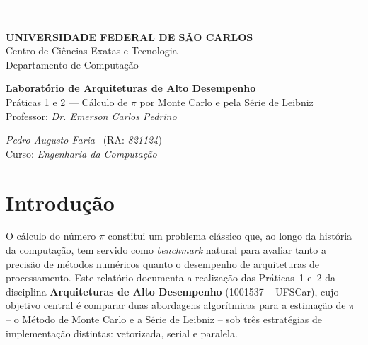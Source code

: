 \documentclass[12pt, a4paper]{article}
\begin{document}
	
	\thispagestyle{empty}
	
	\begin{titlepage}
		\centering
		
		\noindent\rule{\textwidth}{0.8pt}\\[0.2cm]
		{\large \textbf{UNIVERSIDADE FEDERAL DE SÃO CARLOS}}\\[0.15cm]
		{\normalsize Centro de Ciências Exatas e Tecnologia}\\[0.15cm]
		{\normalsize Departamento de Computação}\\[0.15cm]
		
		\vspace{0pt plus 0.35fill}
		
		{\large \textbf{Laboratório de Arquiteturas de Alto Desempenho}}\\[0.4cm]
		{\large Práticas 1 e 2 — Cálculo de $\pi$ por Monte Carlo e pela Série de Leibniz}\\[1.0cm]
		{\normalsize Professor: \textit{Dr. Emerson Carlos Pedrino}}\\
		
		\vspace{0pt plus 0.65fill}
		
		\begin{center}
			{\normalsize \textit{Pedro Augusto Faria} \ (RA: \textit{821124})}\\[0.15cm]

			{\normalsize Curso: \textit{Engenharia da Computação}}\\[0.15cm]
		\end{center}
		
	\end{titlepage}
	
	\setcounter{page}{1}
	
	\section{Introdução}
	
	O cálculo do número $\pi$ constitui um problema clássico que, ao longo da história
	da computação, tem servido como \textit{benchmark} natural para avaliar tanto a
	precisão de métodos numéricos quanto o desempenho de arquiteturas de processamento.
	Este relatório documenta a realização das Práticas~1 e~2 da disciplina
	\textbf{Arquiteturas de Alto Desempenho} (1001537 -- UFSCar), cujo objetivo central
	é comparar duas abordagens algorítmicas para a estimação de $\pi$ -- o Método de
	Monte Carlo e a Série de Leibniz -- sob três estratégias de implementação distintas:
	vetorizada, serial e paralela.
	
\end{document}
